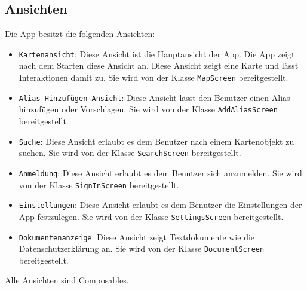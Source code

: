 \subsection{Ansichten}
Die App besitzt die folgenden Ansichten:
\begin{itemize}
    \item \texttt{Kartenansicht}: Diese Ansicht ist die Hauptansicht der App. Die App zeigt nach dem Starten diese Ansicht an. 
    Diese Ansicht zeigt eine Karte und lässt Interaktionen damit zu.
    Sie wird von der Klasse \texttt{MapScreen} bereitgestellt.
    \item \texttt{Alias-Hinzufügen-Ansicht}: Diese Ansicht lässt den Benutzer einen Alias hinzufügen oder Vorschlagen.
    Sie wird von der Klasse \texttt{AddAliasScreen} bereitgestellt.
    \item \texttt{Suche}: Diese Ansicht erlaubt es dem Benutzer nach einem Kartenobjekt zu suchen.
    Sie wird von der Klasse \texttt{SearchScreen} bereitgestellt.
    \item \texttt{Anmeldung}: Diese Ansicht erlaubt es dem Benutzer sich anzumelden.
    Sie wird von der Klasse \texttt{SignInScreen} bereitgestellt.
    \item \texttt{Einstellungen}: Diese Ansicht erlaubt es dem Benutzer die Einstellungen der App festzulegen.
    Sie wird von der Klasse \texttt{SettingsScreen} bereitgestellt.
    \item \texttt{Dokumentenanzeige}: Diese Ansicht zeigt Textdokumente wie die Datenschutzerklärung an.
    Sie wird von der Klasse \texttt{DocumentScreen} bereitgestellt.
\end{itemize}
Alle Ansichten sind Composables.